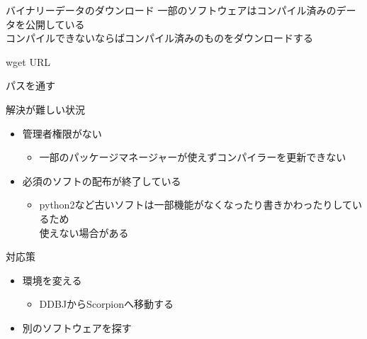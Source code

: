 \documentclass[
  ignorenonframetext,
]{beamer}
\newenvironment{Shaded}{\begin{snugshade}}{\end{snugshade}}
\newcommand{\FunctionTok}[1]{\textcolor[rgb]{0.28,0.35,0.67}{#1}}
\newcommand{\NormalTok}[1]{\textcolor[rgb]{0.00,0.23,0.31}{#1}}
\providecommand{\tightlist}{%
  \setlength{\itemsep}{0pt}\setlength{\parskip}{0pt}}\usepackage{longtable,booktabs,array}
\begin{document}
\begin{frame}[fragile]{バイナリーデータのダウンロード}
\protect\hypertarget{ux30d0ux30a4ux30caux30eaux30fcux30c7ux30fcux30bfux306eux30c0ux30a6ux30f3ux30edux30fcux30c9}{}
一部のソフトウェアはコンパイル済みのデータを公開している\\
コンパイルできないならばコンパイル済みのものをダウンロードする

\begin{Shaded}
\begin{Highlighting}[]
\FunctionTok{wget}\NormalTok{ URL}
\end{Highlighting}
\end{Shaded}

パスを通す

\begin{Shaded}
\begin{Highlighting}[]

\end{Highlighting}
\end{Shaded}
\end{frame}

\begin{frame}{解決が難しい状況}
\protect\hypertarget{ux89e3ux6c7aux304cux96e3ux3057ux3044ux72b6ux6cc1}{}
\begin{itemize}[<+->]
\tightlist
\item
  管理者権限がない

  \begin{itemize}[<+->]
  \tightlist
  \item
    一部のパッケージマネージャーが使えずコンパイラーを更新できない
  \end{itemize}
\item
  必須のソフトの配布が終了している

  \begin{itemize}[<+->]
  \tightlist
  \item
    python2など古いソフトは一部機能がなくなったり書きかわったりしているため\\
    使えない場合がある
  \end{itemize}
\end{itemize}

\begin{block}{対応策}
\protect\hypertarget{ux5bfeux5fdcux7b56}{}
\begin{itemize}[<+->]
\tightlist
\item
  環境を変える

  \begin{itemize}[<+->]
  \tightlist
  \item
    DDBJからScorpionへ移動する
  \end{itemize}
\item
  別のソフトウェアを探す
\end{itemize}
\end{block}
\end{frame}
\end{document}
